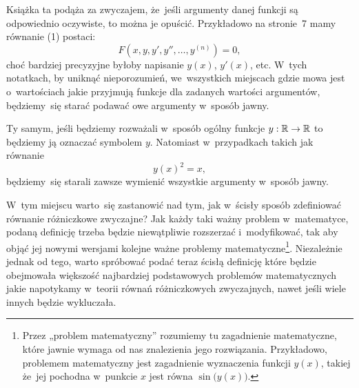 \documentclass[a4paper,11pt]{article}
\begin{document}
\vspace{0em}



\vspace{0em}

\noindent
Książka ta podąża za zwyczajem, że~jeśli argumenty danej funkcji są
odpowiednio oczywiste, to można je opuścić. Przykładowo na stronie~7
mamy równanie (1) postaci:
\begin{equation}
  \label{eq:Matwiejew-Metody-calkowania-ETC-01}
  F\left( x, y, y', y'', \ldots, y^{ ( n ) } \right) = 0,
\end{equation}
choć bardziej precyzyjne byłoby napisanie $y( x )$, $y'( x )$, etc. W~tych
notatkach, by uniknąć nieporozumień, we~wszystkich miejscach gdzie mowa jest
o~wartościach jakie przyjmują funkcje dla zadanych wartości argumentów,
będziemy~się starać podawać owe argumenty w~sposób jawny.

Ty samym, jeśli będziemy rozważali w~sposób ogólny funkcje
$y : \mathbb{R} \to \mathbb{R}$ to będziemy ją oznaczać symbolem $y$. Natomiast
w~przypadkach takich jak równanie
\begin{equation}
  \label{eq:Matwiejew-Metody-calkowania-ETC-02}
  y( x )^{ 2 } = x,
\end{equation}
będziemy~się starali zawsze wymienić wszystkie argumenty w~sposób jawny.

\vspace{\VerSpaceFour}











\vspace{0em}


\noindent
{} W~tym miejscu warto~się zastanowić nad tym, jak w~ścisły sposób
zdefiniować równanie różniczkowe zwyczajne? Jak każdy taki ważny
problem w~matematyce, podaną definicję trzeba będzie niewątpliwie rozszerzać
i~modyfikować, tak aby objąć jej nowymi wersjami kolejne ważne problemy
matematyczne\footnote{Przez „problem matematyczny” rozumiemy tu zagadnienie
  matematyczne, które jawnie wymaga od nas znalezienia jego rozwiązania.
  Przykładowo, problemem matematyczny jest zagadnienie wyznaczenia
  funkcji $y( x )$, takiej że~jej pochodna w~punkcie $x$ jest równa
  $\sin\!\big( y( x ) \big)$. }. Niezależnie jednak od tego, warto spróbować
podać teraz ścisłą definicję które będzie obejmowała większość najbardziej
podstawowych problemów matematycznych jakie napotykamy w~teorii równań
różniczkowych zwyczajnych, nawet jeśli wiele innych będzie wykluczała.
\end{document}
